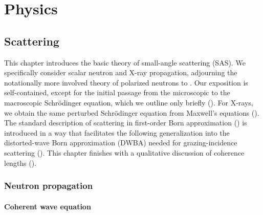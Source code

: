 
\part{Physics}\label{PPHYS}

\chapter{Scattering}  \label{SSca}


This chapter introduces the basic theory of small-angle scattering (SAS).
%
%
We specifically consider scalar neutron and X-ray propagation,
adjourning the notationally more involved
theory of polarized neutrons to .
Our exposition is self-contained,
except for the initial passage from the microscopic
to the macroscopic Schrödinger equation,
which we outline only briefly ().
For X-rays, we obtain the same perturbed Schrödinger equation from Maxwell's equations
().
The standard description of scattering in first-order Born approximation
()
is introduced in a way that facilitates the following generalization
into the distorted-wave Born approximation (DWBA)
needed for grazing-incidence scattering ().
This chapter finishes with a qualitative discussion
of coherence lengths ().

\section{Neutron propagation}\label{Swave}
%
%

\subsection{Coherent wave equation}\label{ScohWave}

